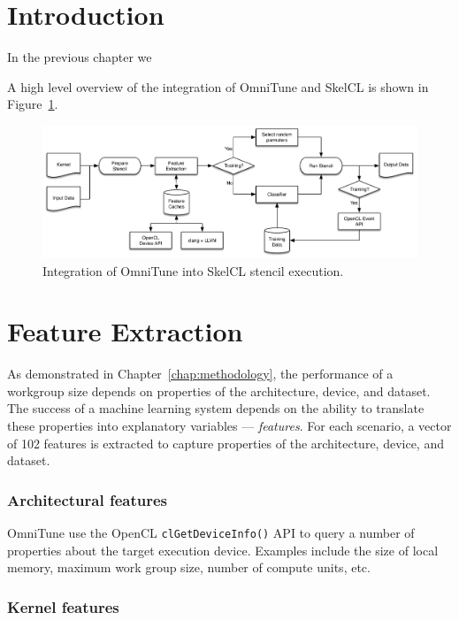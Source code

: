 \section{Introduction}

In the previous chapter we

A high level overview of the integration of OmniTune and SkelCL is
shown in Figure~\ref{fig:omnitune-system-flow}.

\begin{figure}
\centering
\includegraphics[width=\textwidth]{img/omnitune-system-flow.pdf}
\caption{%
  Integration of OmniTune into SkelCL stencil execution.%
}
\label{fig:omnitune-system-flow}
\end{figure}

\section{Feature Extraction}

As demonstrated in Chapter~\ref{chap:methodology}, the performance of
a workgroup size depends on properties of the architecture, device,
and dataset. The success of a machine learning system depends on the
ability to translate these properties into explanatory variables ---
\emph{features}. For each scenario, a vector of 102 features is
extracted to capture properties of the architecture, device, and
dataset.


\subsubsection{Architectural features}

OmniTune use the OpenCL \texttt{clGetDeviceInfo()} API to query a
number of properties about the target execution device. Examples
include the size of local memory, maximum work group size, number of
compute units, etc.


\subsubsection{Kernel features}

